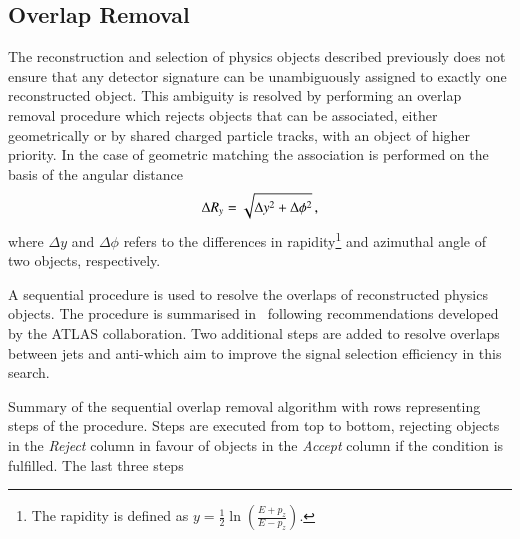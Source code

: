 \subsection{Overlap Removal}
\label{sec:overlap_removal}

The reconstruction and selection of physics objects described
previously does not ensure that any detector signature can be
unambiguously assigned to exactly one reconstructed object. This
ambiguity is resolved by performing an overlap removal procedure which
rejects objects that can be associated, either geometrically or by
shared charged particle tracks, with an object of higher priority. In
the case of geometric matching the association is performed on the
basis of the angular distance
\begin{align*}
  \Delta R_y = \sqrt{\Delta y^2 + \Delta \phi^2} \,\text{,}
\end{align*}
where $\Delta y$ and $\Delta \phi$ refers to the differences in
rapidity\footnote{The rapidity is defined as
  $y = \frac{1}{2} \ln \left( \frac{E + p_z}{E - p_z} \right)$.} and azimuthal
angle of two objects, respectively.

A sequential procedure is used to resolve the overlaps of
reconstructed physics objects. The procedure is summarised
in~ following recommendations developed by
the ATLAS collaboration. Two additional steps are added to resolve
overlaps between jets and anti-\tauhadvis which aim to improve the
signal selection efficiency in this search.

\begin{table}[htbp]
  \centering


  \caption{Summary of the sequential overlap removal algorithm with
    rows representing steps of the procedure. Steps are executed from
    top to bottom, rejecting objects in the \emph{Reject} column in
    favour of objects in the \emph{Accept} column if the condition is
    fulfilled. The last three steps }%
  \label{tab:overlap_removal}

  \resizebox{\textwidth}{!}{%
    
  }
\end{table}

